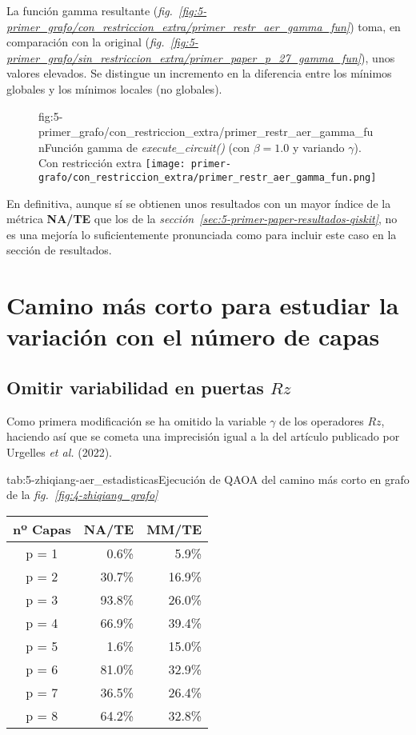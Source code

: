 La función gamma resultante (\textit{fig.~\ref{fig:5-primer_grafo/con_restriccion_extra/primer_restr_aer_gamma_fun}}) toma, en comparación con la original (\textit{fig.~\ref{fig:5-primer_grafo/sin_restriccion_extra/primer_paper_p_27_gamma_fun}}), unos valores elevados.
Se distingue un incremento en la diferencia entre los mínimos globales y los mínimos locales (no globales).

\begin{figure}[Resultados QAOA {--} artículo de Fan \textit{et al.} (2023) {--} función gamma con restricción extra]{fig:5-primer_grafo/con_restriccion_extra/primer_restr_aer_gamma_fun}{Función gamma de \textit{execute\_circuit()} (con $\beta = 1.0$ y variando $\gamma$). Con restricción extra}
  \centering
  \texttt{[image: primer-grafo/con\_restriccion\_extra/primer\_restr\_aer\_gamma\_fun.png]}
\end{figure}

En definitiva, aunque sí se obtienen unos resultados con un mayor índice de la métrica \textbf{NA/TE} que los de la \textit{sección~\ref{sec:5-primer-paper-resultados-qiskit}}, no es una mejoría lo suficientemente pronunciada como para incluir este caso en la sección de resultados.


\section{Camino más corto para estudiar la variación con el número de capas\label{sec:8-zhiqiang}}

\subsection{Omitir variabilidad en puertas $Rz$}

Como primera modificación se ha omitido la variable $\gamma$ de los operadores $Rz$, haciendo así que se cometa una imprecisión igual a la del artículo publicado por Urgelles \textit{et al.} (2022)\cite{multi-objective_routing_optimization}.

\begin{table}[Resultados QAOA {--} artículo de Fan \textit{et al.} (2023) {--} puertas $Rz$ constantes]{tab:5-zhiqiang-aer_estadisticas}{Ejecución de QAOA del camino más corto en grafo de la \textit{fig.~\ref{fig:4-zhiqiang_grafo}}}
  \centering
  \begin{tabular}{|c|r|r|}
    \hline
    \textbf{nº Capas} & \textbf{NA/TE} & \textbf{MM/TE} \\ \hline
    p = 1 &  0.6\% &  5.9\% \\ \hline
    p = 2 & 30.7\% & 16.9\% \\ \hline
    p = 3 & 93.8\% & 26.0\% \\ \hline
    p = 4 & 66.9\% & 39.4\% \\ \hline
    p = 5 &  1.6\% & 15.0\% \\ \hline
    p = 6 & 81.0\% & 32.9\% \\ \hline
    p = 7 & 36.5\% & 26.4\% \\ \hline
    p = 8 & 64.2\% & 32.8\% \\ \hline
  \end{tabular}
\end{table}

